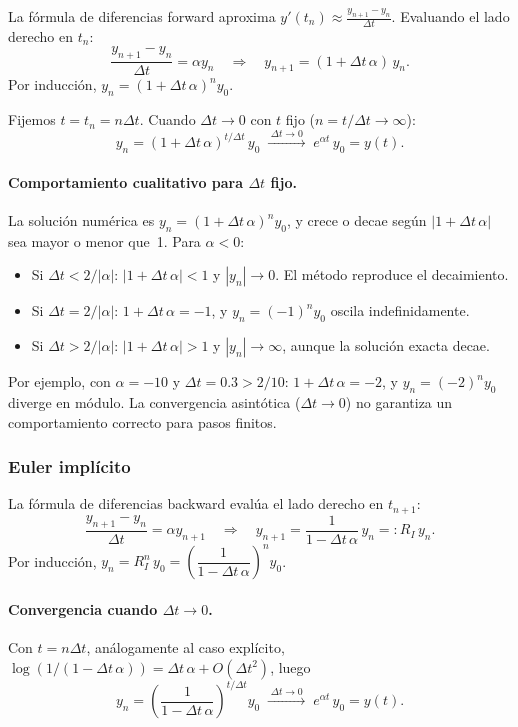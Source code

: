 \documentclass[a4paper,11pt]{report}
\begin{document}
La fórmula de diferencias forward aproxima $y'(t_n)\approx\frac{y_{n+1}-y_n}{\Delta t}$. Evaluando el lado derecho en $t_n$:
\[
  \frac{y_{n+1}-y_n}{\Delta t}=\alpha y_n\quad\Longrightarrow\quad y_{n+1}=(1+\Delta t\,\alpha)\,y_n.
\]
Por inducción, $y_n=(1+\Delta t\,\alpha)^n y_0$.

Fijemos $t=t_n=n\Delta t$. Cuando $\Delta t\to0$ con $t$ fijo ($n=t/\Delta t\to\infty$):
\[
  y_n=(1+\Delta t\,\alpha)^{t/\Delta t}\,y_0\;\xrightarrow{\;\Delta t\to0\;}\;e^{\alpha t}\,y_0=y(t).
\]

\paragraph{Comportamiento cualitativo para $\Delta t$ fijo.}
La solución numérica es $y_n=(1+\Delta t\,\alpha)^n y_0$, y crece o decae según $|1+\Delta t\,\alpha|$ sea mayor o menor que~1. Para $\alpha<0$:
\begin{itemize}
  \item Si $\Delta t<2/|\alpha|$: $|1+\Delta t\,\alpha|<1$ y $|y_n|\to0$. El método reproduce el decaimiento. 
  \item Si $\Delta t=2/|\alpha|$: $1+\Delta t\,\alpha=-1$, y $y_n=(-1)^n y_0$ oscila indefinidamente. 
  \item Si $\Delta t>2/|\alpha|$: $|1+\Delta t\,\alpha|>1$ y $|y_n|\to\infty$, aunque la solución exacta decae. 
\end{itemize}
Por ejemplo, con $\alpha=-10$ y $\Delta t=0.3>2/10$: $1+\Delta t\,\alpha=-2$, y $y_n=(-2)^n y_0$ diverge en módulo. La convergencia asintótica ($\Delta t\to0$) no garantiza un comportamiento correcto para pasos finitos.

\subsubsection*{Euler implícito}

La fórmula de diferencias backward evalúa el lado derecho en $t_{n+1}$:
\[
  \frac{y_{n+1}-y_n}{\Delta t}=\alpha y_{n+1}\quad\Longrightarrow\quad y_{n+1}=\frac{1}{1-\Delta t\,\alpha}\,y_n=:R_I\,y_n.
\]
Por inducción, $y_n=R_I^n\,y_0=\left(\dfrac{1}{1-\Delta t\,\alpha}\right)^n y_0$.

\paragraph{Convergencia cuando $\Delta t\to0$.}
Con $t=n\Delta t$, análogamente al caso explícito, $\log(1/(1-\Delta t\,\alpha))=\Delta t\,\alpha+O(\Delta t^2)$, luego
\[
  y_n=\left(\frac{1}{1-\Delta t\,\alpha}\right)^{t/\Delta t} y_0\;\xrightarrow{\;\Delta t\to0\;}\;e^{\alpha t}\,y_0=y(t).
\]
\end{document}
